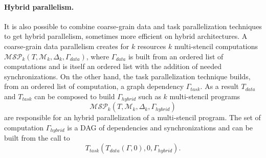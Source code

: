 \paragraph{Hybrid parallelism.}
It is also possible to combine coarse-grain data and task parallelization techniques to get hybrid parallelism, sometimes more efficient on hybrid architectures. A coarse-grain data parallelism creates for $k$ resources $k$ multi-stencil computations $\mathcal{MSP}_k(T,\mathcal{M}_k,\Delta_k,\Gamma_{data})$, where $\Gamma_{data}$ is built from an ordered list of computations and is itself an ordered list with the addition of needed synchronizations. On the other hand, the task parallelization technique builds, from an ordered list of computation, a graph dependency $\Gamma_{task}$. As a result $T_{data}$ and $T_{task}$ can be composed to build $\Gamma_{hybrid}$ such as $k$ multi-stencil programs
\begin{equation*}
\mathcal{MSP}_k(T,\mathcal{M}_k,\Delta_k,\Gamma_{hybrid})
\end{equation*}
are responsible for an hybrid parallelization of a multi-stencil program. The set of computation $\Gamma_{hybrid}$ is a DAG of dependencies and synchronizations and can be built from the call to 
\begin{equation*}
T_{task}(T_{data}(\Gamma,0),0,\Gamma_{hybrid}).
\end{equation*}
